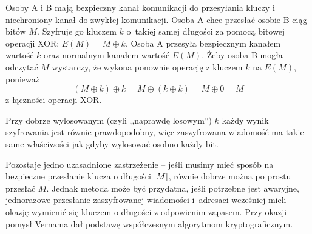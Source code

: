 Osoby A i B mają bezpieczny kanał komunikacji do przesyłania kluczy i niechroniony kanał do zwykłej komunikacji. Osoba A chce przesłać osobie B ciąg bitów \( M \).
Szyfruje go kluczem \( k \) o~takiej samej długości za pomocą bitowej operacji XOR: \( E(M) = M \oplus k \).
Osoba A przesyła bezpiecznym kanałem wartość \( k \) oraz normalnym kanałem wartość \( E(M) \). Żeby osoba B mogła odczytać \( M \) wystarczy, że wykona ponownie operację z kluczem \( k \) na \( E(M) \), ponieważ
\[
    (M \oplus k) \oplus k = M \oplus (k \oplus k)  = M \oplus 0 = M
\]
z łączności operacji XOR.

Przy dobrze wylosowanym (czyli ,,naprawdę losowym'') \( k \) każdy wynik szyfrowania jest równie prawdopodobny, więc zaszyfrowana wiadomość ma takie same właściwości jak gdyby wylosować osobno każdy bit.

Pozostaje jedno uzasadnione zastrzeżenie -- jeśli musimy mieć sposób na bezpieczne przesłanie klucza o długości \( \left\lvert M\right\rvert \), równie dobrze można po prostu przesłać \( M \).
Jednak metoda może być przydatna, jeśli potrzebne jest awaryjne, jednorazowe przesłanie zaszyfrowanej wiadomości i~adresaci wcześniej mieli okazję wymienić się kluczem o długości z odpowienim zapasem. Przy okazji pomysł Vernama dał podstawę współczesnym algorytmom kryptograficznym.